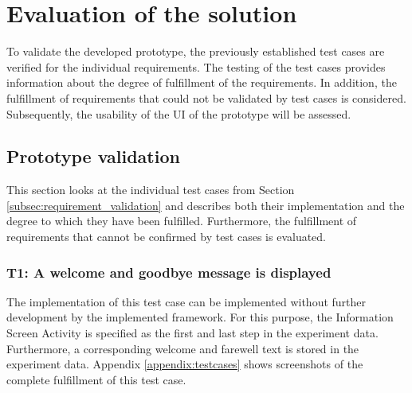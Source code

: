 \newpage\section{Evaluation of the solution}

To validate the developed prototype, the previously established test cases are verified for the individual requirements. The testing of the test cases provides information about the degree of fulfillment of the requirements. In addition, the fulfillment of requirements that could not be validated by test cases is considered. Subsequently, the usability of the UI of the prototype will be assessed.

\subsection{Prototype validation}
This section looks at the individual test cases from Section \ref{subsec:requirement_validation} and describes both their implementation and the degree to which they have been fulfilled. Furthermore, the fulfillment of requirements that cannot be confirmed by test cases is evaluated. 

\subsubsection*{T1: A welcome and goodbye message is displayed} 

The implementation of this test case can be implemented without further development by the implemented framework. For this purpose, the Information Screen Activity is specified as the first and last step in the experiment data. Furthermore, a corresponding welcome and farewell text is stored in the experiment data. Appendix \ref{appendix:testcases} shows screenshots of the complete fulfillment of this test case.


